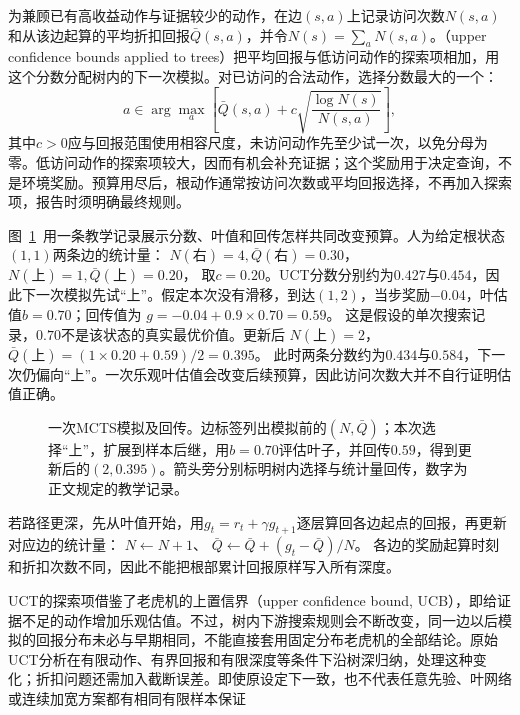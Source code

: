 为兼顾已有高收益动作与证据较少的动作，在边$(s,a)$上记录访问次数$N(s,a)$和从该边起算的平均折扣回报$\bar Q(s,a)$，并令$N(s)=\sum_aN(s,a)$。（upper confidence bounds applied to trees）把平均回报与低访问动作的探索项相加，用这个分数分配树内的下一次模拟。对已访问的合法动作，选择分数最大的一个：
\begin{equation}
 a\in\arg\max_a\left[
 \bar Q(s,a)+c\sqrt{\frac{\log N(s)}{N(s,a)}}\right],
 \label{eq:rl-planning-uct}
\end{equation}
其中$c>0$应与回报范围使用相容尺度，未访问动作先至少试一次，以免分母为零。低访问动作的探索项较大，因而有机会补充证据；这个奖励用于决定查询，不是环境奖励。预算用尽后，根动作通常按访问次数或平均回报选择，不再加入探索项，报告时须明确最终规则。

图~\ref{fig:rl-planning-mcts}~用一条教学记录展示分数、叶值和回传怎样共同改变预算。人为给定根状态$(1,1)$两条边的统计量：
$N(\text{右})=4,\bar Q(\text{右})=0.30$，
$N(\text{上})=1,\bar Q(\text{上})=0.20$，
取$c=0.20$。UCT分数分别约为$0.427$与$0.454$，因此下一次模拟先试“上”。假定本次没有滑移，到达$(1,2)$，当步奖励$-0.04$，叶估值$b=0.70$；回传值为
$g=-0.04+0.9\times0.70=0.59$。
这是假设的单次搜索记录，$0.70$不是该状态的真实最优价值。更新后
$N(\text{上})=2$，
$\bar Q(\text{上})=(1\times0.20+0.59)/2=0.395$。
此时两条分数约为$0.434$与$0.584$，下一次仍偏向“上”。一次乐观叶估值会改变后续预算，因此访问次数大并不自行证明估值正确。

\begin{figure}[htbp]
 \centering
 
 \caption{一次MCTS模拟及回传。边标签列出模拟前的$(N,\bar Q)$；本次选择“上”，扩展到样本后继，用$b=0.70$评估叶子，并回传$0.59$，得到更新后的$(2,0.395)$。箭头旁分别标明树内选择与统计量回传，数字为正文规定的教学记录。}
 \label{fig:rl-planning-mcts}
\end{figure}

若路径更深，先从叶值开始，用$g_t=r_t+\gamma g_{t+1}$逐层算回各边起点的回报，再更新对应边的统计量：
$N\leftarrow N+1$、
$\bar Q\leftarrow\bar Q+(g_t-\bar Q)/N$。
各边的奖励起算时刻和折扣次数不同，因此不能把根部累计回报原样写入所有深度。

UCT的探索项借鉴了老虎机的上置信界（upper confidence bound, UCB），即给证据不足的动作增加乐观估值。不过，树内下游搜索规则会不断改变，同一边以后模拟的回报分布未必与早期相同，不能直接套用固定分布老虎机的全部结论。原始UCT分析在有限动作、有界回报和有限深度等条件下沿树深归纳，处理这种变化；折扣问题还需加入截断误差。即使原设定下一致，也不代表任意先验、叶网络或连续加宽方案都有相同有限样本保证

